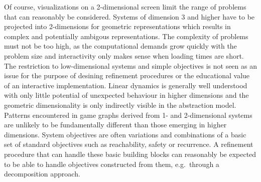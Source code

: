 Of course, visualizations on a 2-dimensional screen limit the range of problems that can reasonably be considered.
Systems of dimension 3 and higher have to be projected into 2-dimensions for geometric representations which results in complex and potentially ambigous representations.
The complexity of problems must not be too high, as the computational demands grow quickly with the problem size and interactivity only makes sense when loading times are short.
The restriction to low-dimensional systems and simple objectives is not seen as an issue for the purpose of desining refinement procedures or the educational value of an interactive implementation.
Linear dynamics is generally well understood with only little potential of unexpected behaviour in higher dimensions and the geometric dimensionality is only indirectly visible in the abstraction model.
Patterns encountered in game graphs derived from 1- and 2-dimensional systems are unlikely to be fundamentally different than those emerging in higher dimensions.
System objectives are often variations and combinations of a basic set of standard objectives such as reachability, safety or recurrence.
A refinement procedure that can handle these basic building blocks can reasonably be expected to be able to handle objectives constructed from them, e.g.\ through a decomposition approach.

